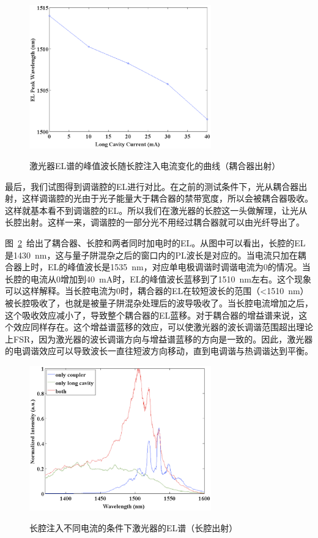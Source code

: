 \documentclass{ZJUthesis}
\begin{document}
\begin{figure}[htbp]
  \centering
  \includegraphics[width=0.7\textwidth]{./Pictures/blueshift3.eps}\\
  \caption{激光器EL谱的峰值波长随长腔注入电流变化的曲线（耦合器出射）}
  \label{fig_blueshift3}
\end{figure}

最后，我们试图得到调谐腔的EL进行对比。在之前的测试条件下，光从耦合器出射，这样调谐腔的光由于光子能量大于耦合器的禁带宽度，所以会被耦合器吸收。这样就基本看不到调谐腔的EL。所以我们在激光器的长腔这一头做解理，让光从长腔出射。这样一来，调谐腔的一部分光不用经过耦合器就可以由光纤导出了。

图~\ref{fig_blueshift4}~给出了耦合器、长腔和两者同时加电时的EL。从图中可以看出，长腔的EL是1430~nm，这与量子阱混杂之后的窗口内的PL波长是对应的。当电流只加在耦合器上时，EL的峰值波长是1535~nm，对应单电极调谐时调谐电流为0的情况。当长腔的电流从0增加到40~mA时，EL的峰值波长蓝移到了1510~nm左右。这个现象可以这样解释。当长腔电流为0时，耦合器的EL在较短波长的范围（<1510~nm）被长腔吸收了，也就是被量子阱混杂处理后的波导吸收了。当长腔电流增加之后，这个吸收效应减小了，导致整个耦合器的EL蓝移。对于耦合器的增益谱来说，这个效应同样存在。这个增益谱蓝移的效应，可以使激光器的波长调谐范围超出理论上FSR，因为激光器的波长调谐方向与增益谱蓝移的方向是一致的。因此，激光器的电调谐效应可以导致波长一直往短波方向移动，直到电调谐与热调谐达到平衡。

\begin{figure}[htbp]
  \centering
  \includegraphics[width=0.7\textwidth]{./Pictures/blueshift4.eps}\\
  \caption{长腔注入不同电流的条件下激光器的EL谱（长腔出射）}
  \label{fig_blueshift4}
\end{figure}
\end{document}
